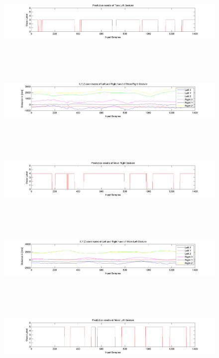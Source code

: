 \label{ev:test:prediction} 
\begin{figure}
	\hspace{-35 mm} 
	\includegraphics[height=37mm]{figures/result/test-prediction-turn-left.jpg} 
\end{figure}
\begin{figure}
	\hspace{-35 mm} 
	\includegraphics[height=37mm]{figures/result/test-axis-move-right.jpg} 
\end{figure}
\begin{figure}
	\hspace{-35 mm} 
	\includegraphics[height=37mm]{figures/result/test-prediction-move-right.jpg} 
\end{figure}
\begin{figure}
	\hspace{-35 mm} 
	\includegraphics[height=37mm]{figures/result/test-axis-move-left.jpg} 
\end{figure}
\begin{figure}
	\hspace{-35 mm} 
	\includegraphics[height=37mm]{figures/result/test-prediction-move-left.jpg} 
\end{figure}
